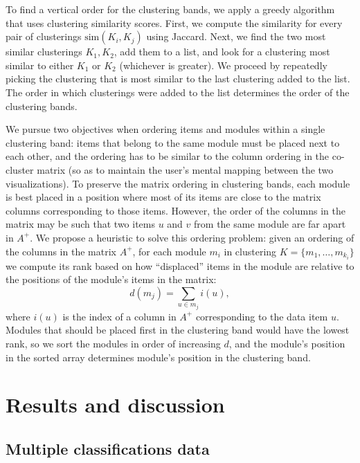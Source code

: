 \documentclass[12pt]{cmuthesis}
\begin{document}

  To find a vertical order for the clustering bands, we apply a greedy algorithm that uses clustering similarity scores. First, we compute the similarity for every pair of clusterings $\textrm{sim}(K_{i}, K_{j})$ using Jaccard. Next, we find the two most similar clusterings $K_{1}, K_{2}$, add them to a list, and look for a clustering most similar to either $K_{1}$ or $K_{2}$ (whichever is greater). We proceed by repeatedly picking the clustering that is most similar to the last clustering added to the list. The order in which clusterings were added to the list determines the order of the clustering bands.


  We pursue two objectives when ordering items and modules within a single clustering band: items that belong to the same module must be placed next to each other, and the ordering has to be similar to the column ordering in the co-cluster matrix (so as to maintain the user's mental mapping between the two visualizations). To preserve the matrix ordering in clustering bands, each module is best placed in a position where most of its items are close to the matrix columns corresponding to those items. However, the order of the columns in the matrix may be such that two items $u$ and $v$ from the same module are far apart in $A^{+}$. We propose a heuristic to solve this ordering problem: given an ordering of the columns in the matrix $A^{+}$, for each module $m_{i}$ in clustering $K = \{m_{1}, \ldots, m_{k_{i}}\}$ we compute its rank based on how ``displaced'' items in the module are relative to the positions of the module's items in the matrix: 
  \[
   d(m_{j}) = \sum_{u \in m_{j}} i(u),
  \]
  where $i(u)$ is the index of a column in $A^{+}$ corresponding to the data item $u$. Modules that should be placed first in the clustering band would have the lowest rank, so we sort the modules in order of increasing $d$, and the module's position in the sorted array determines module's position in the clustering band.

\section{Results and discussion}

  \subsection{Multiple classifications data}
  \label{sec:data}
\end{document}
